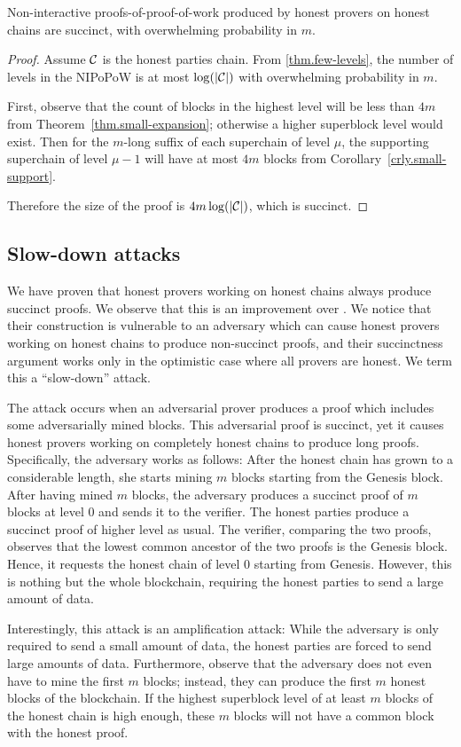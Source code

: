 \begin{theorem}
    Non-interactive proofs-of-proof-of-work produced by honest provers on
    honest chains are succinct, with overwhelming probability in $m$.
\end{theorem}
\begin{proof}
    Assume $\mathcal{C}$ is the honest parties chain. From \ref{thm.few-levels}, the
    number of levels in the NIPoPoW is at most $\log(|\mathcal{C}|)$ with
    overwhelming probability in $m$.

    First, observe that the count of blocks in the highest level will be less
    than $4m$ from Theorem~\ref{thm.small-expansion}; otherwise a higher
    superblock level would exist. Then for the $m$-long suffix of each
    superchain of level $\mu$, the supporting superchain of level $\mu - 1$
    will have at most $4m$ blocks from Corollary~\ref{crly.small-support}.

    Therefore the size of the proof is $4m \log(|\mathcal{C}|)$, which is succinct.
\end{proof}

\subsection{Slow-down attacks}

We have proven that honest provers working on honest chains always produce succinct
proofs. We observe that this is an improvement over \cite{KLS}. We notice that
their construction is vulnerable to an adversary which can cause honest provers
working on honest chains to produce non-succinct proofs, and their succinctness
argument works only in the optimistic case where all provers are honest. We
term this a ``slow-down'' attack.

The attack occurs when an adversarial prover produces a proof which includes
some adversarially mined blocks. This adversarial proof is succinct, yet it
causes honest provers working on completely honest chains to produce long
proofs. Specifically, the adversary works as follows: After the honest chain
has grown to a considerable length, she starts mining $m$ blocks starting from
the Genesis block. After having mined $m$ blocks, the adversary produces a
succinct proof of $m$ blocks at level $0$ and sends it to the verifier. The
honest parties produce a succinct proof of higher level as usual. The verifier,
comparing the two proofs, observes that the lowest common ancestor of the two
proofs is the Genesis block. Hence, it requests the honest chain of level $0$
starting from Genesis. However, this is nothing but the whole blockchain,
requiring the honest parties to send a large amount of data.

Interestingly, this attack is an amplification attack: While the adversary is
only required to send a small amount of data, the honest parties are forced to
send large amounts of data. Furthermore, observe that the adversary does not
even have to mine the first $m$ blocks; instead, they can produce the first $m$
honest blocks of the blockchain. If the highest superblock level of at least
$m$ blocks of the honest chain is high enough, these $m$ blocks will not have a
common block with the honest proof.
